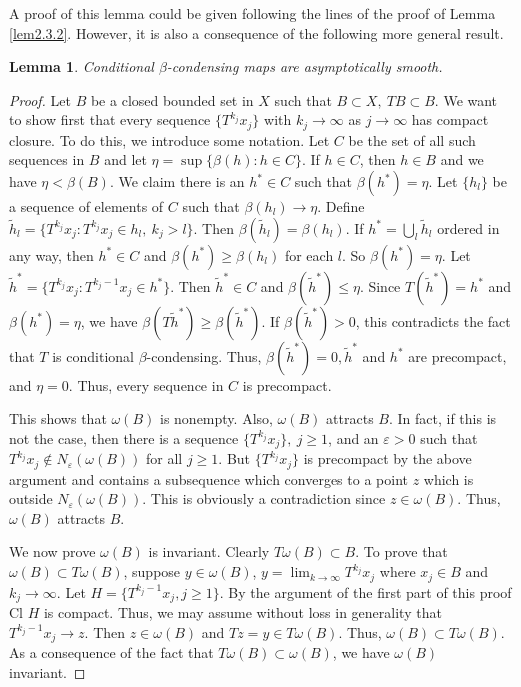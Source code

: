 \documentclass{surv-l}
\theoremstyle{plain}
\newtheorem{lemma}[theorem]{Lemma}
\theoremstyle{definition}
\numberwithin{equation}{section}
\numberwithin{figure}{chapter}
\begin{document}
A proof of this lemma could be given following the lines of the proof of Lemma \ref{lem2.3.2}. However, it is also a consequence of the following more general result.

\begin{lemma}\label{lem2.3.5} Conditional $\beta$-condensing maps are asymptotically smooth.
\end{lemma}

\begin{proof}
Let $B$ be a closed bounded set in $X$ such that $B\subset X,\ TB\subset B$. We want to show first that every sequence $\{T^{k_{j}}x_{j}\}$ with $ k_{j}\rightarrow\infty$ as $ j\rightarrow\infty$ has compact closure. To do this, we introduce some notation. Let $C$ be the set of all such sequences in $B$ and let $ \eta=\sup\{\beta(h)\!:h\in C\}$. If $h\in C$, then $h\in B$ and we have $\eta<\beta(B)$. We claim there is an $h^{\ast}\in C$ such that $\beta(h^{\ast})=\eta$. Let $\{h_{l}\}$ be a sequence of elements of $C$ such that $\beta(h_{l})\rightarrow\eta$. Define $\tilde{h}_{l}=\{T^{k_{j}}x_{j}\!:T^{k_{j}}x_{j}\in h_{l},\ k_{j}>l\}$. Then $\beta(\tilde{h}_{l})=\beta(h_{l})$. If $h^{\ast}= \bigcup_{l}\tilde{h}_{l}$ ordered in any way, then $h^{\ast}\in C$ and $\beta(h^{\ast})\geq\beta(h_{l})$ for each $l$. So $\beta(h^{\ast})=\eta$. Let $\tilde{h}^{\ast}=\{T^{k_{j}}x_{j}\!:T^{k_{j}-1}x_{j}\in h^{\ast}\}$. Then $\tilde{h}^{\ast}\in C$ and $\beta(\tilde{h}^{\ast})\leq\eta$. Since $T(\tilde{h}^{\ast})=h^{\ast}$ and $\beta(h^{\ast})=\eta$, we have $\beta(T\tilde{h}^{\ast})\geq\beta(\tilde{h}^{\ast})$. If $\beta(\tilde{h}^{\ast})>0$, this contradicts the fact that $T$ is conditional $\beta$-condensing. Thus, $\beta(\tilde{h}^{\ast})=0,\tilde{h}^{\ast}$ and $h^{\ast}$ are precompact, and $\eta=0$. Thus, every sequence in $C$ is precompact.

This shows that $\omega(B)$ is nonempty. Also, $\omega(B)$ attracts $B$. In fact, if this is not the case, then there is a sequence $\{T^{k_{j}}x_{j}\},\ j\geq 1$, and an $\varepsilon >0$ such that $T^{k_{j}}x_{j}\not\in N_{\varepsilon}(\omega(B))$ for all $j\geq 1$. But $\{T^{k_{j}}x_{j}\}$ is precompact by the above argument and contains a subsequence which converges to a point $z$ which is outside $N_{\varepsilon}(\omega(B))$. This is obviously a contradiction since $z\in \omega(B)$. Thus, $\omega(B)$ attracts $B$.

We now prove $\omega(B)$ is invariant. Clearly $T\omega(B)\subset B$. To prove that $\omega(B)\subset T\omega(B)$, suppose $y\in\omega(B)$, $y= \lim_{k\rightarrow\infty}T^{k_{j}}x_{j}$ where $x_{j}\in B$ and $ k_{j}\rightarrow\infty$. Let $H=\{T^{k_{j}-1}x_{j}, j\geq 1\}$. By the argument of the first part of this proof Cl $H$ is compact. Thus, we may assume without loss in generality that $T^{k_{j}-1}x_{j}\rightarrow z$. Then $z\in \omega(B)$ and $Tz=y\in T\omega(B)$. Thus, $\omega(B)\subset T\omega(B)$. As a consequence of the fact that $T\omega(B)\subset\omega(B)$, we have $\omega(B)$ invariant.


\end{proof}
\end{document}
